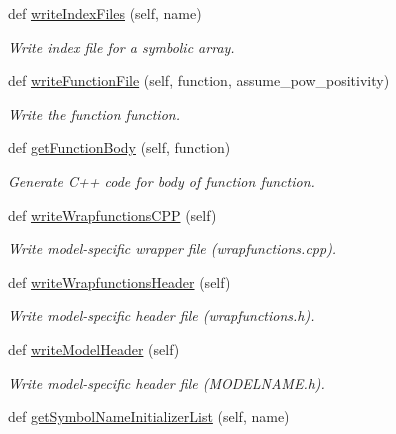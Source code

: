 \begin{DoxyCompactItemize}
def \mbox{\hyperlink{classamici_1_1sbml__import_1_1_sbml_importer_a3d3ce5678111ebd3987ec0539f07438e}{write\+Index\+Files}} (self, name)
\begin{DoxyCompactList}\small\item\em Write index file for a symbolic array. \end{DoxyCompactList}\item 
def \mbox{\hyperlink{classamici_1_1sbml__import_1_1_sbml_importer_a85e1499fa29b10b4a0b4afc82feec4e9}{write\+Function\+File}} (self, function, assume\+\_\+pow\+\_\+positivity)
\begin{DoxyCompactList}\small\item\em Write the function {\ttfamily function}. \end{DoxyCompactList}\item 
def \mbox{\hyperlink{classamici_1_1sbml__import_1_1_sbml_importer_a500fe2b103c67fe14f16d7076a114029}{get\+Function\+Body}} (self, function)
\begin{DoxyCompactList}\small\item\em Generate C++ code for body of function {\ttfamily function}. \end{DoxyCompactList}\item 
def \mbox{\hyperlink{classamici_1_1sbml__import_1_1_sbml_importer_a2ba24adc6b9fafdf99f5acd200acf17a}{write\+Wrapfunctions\+C\+PP}} (self)
\begin{DoxyCompactList}\small\item\em Write model-\/specific \textquotesingle{}wrapper\textquotesingle{} file (wrapfunctions.\+cpp). \end{DoxyCompactList}\item 
def \mbox{\hyperlink{classamici_1_1sbml__import_1_1_sbml_importer_ad16157bcd165452e4ff9aa9d6f12b907}{write\+Wrapfunctions\+Header}} (self)
\begin{DoxyCompactList}\small\item\em Write model-\/specific header file (wrapfunctions.\+h). \end{DoxyCompactList}\item 
def \mbox{\hyperlink{classamici_1_1sbml__import_1_1_sbml_importer_aa549fe60f186fefb87b71a2461b0a270}{write\+Model\+Header}} (self)
\begin{DoxyCompactList}\small\item\em Write model-\/specific header file (M\+O\+D\+E\+L\+N\+A\+M\+E.\+h). \end{DoxyCompactList}\item 
def \mbox{\hyperlink{classamici_1_1sbml__import_1_1_sbml_importer_a1280dbd6e4ab980a25798bf8d88670b9}{get\+Symbol\+Name\+Initializer\+List}} (self, name)

\end{DoxyCompactItemize}
